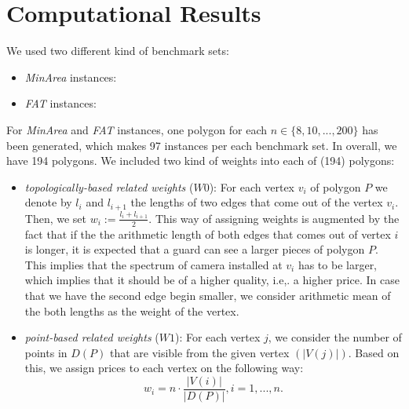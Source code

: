 \documentclass[runningheads,a4paper]{elsarticle}
\begin{document}
	\begin{comment}
	
	\noindent \textbf{Improvements of the above method.} The above method can serve as a basic iteration
	of a more advanced techniques like ILP-LNS or CMSA. In this case, methods for destructing the solutions
	has to be proposed.  Underlying idea could be:
	\begin{itemize}
	\item remove $N$ guards with the largest costs out of $C'$
	\item remove $N$ guards which have a higher amount of points from $D(P)$ covered by other guards, represented by the function
	\begin{align}
	ratio(i) = \frac{\sum_{v \in V\setminus{ \{i\}}, j \in V(i)} 1_{j \mbox{ is veasible from } v} }{|V(i)|}.
	\end{align}
	\end{itemize}
	\end{comment}
	
	\section{Computational Results}

 We used two different kind of benchmark sets:
     \begin{itemize}
     	 \item \emph{MinArea} instances:
     	 \item \emph{FAT} instances: 
     \end{itemize}
     For \emph{MinArea} and \emph{FAT} instances, one polygon for each $n \in\{8,10,...,200\}$ has been generated, which makes 97 instances per each benchmark set. In overall, we have 194 polygons. 
	We included two kind of weights into each of (194) polygons:
	\begin{itemize}
		\item \emph{topologically-based related weights} ($W0$): For each vertex $v_i$ of polygon $P$ we denote by $l_i$ and $l_{i+1}$ the lengths of two edges that come out of the vertex $v_i$. Then, we set $w_i := \frac{l_i + l_{i+1}}{2}$. This way of assigning weights is augmented by the fact that if the the arithmetic length of both edges that comes out of vertex $i$ is longer, it is expected that a guard can see a larger pieces of polygon $P$. This implies that the spectrum of camera installed at $v_i$ has to be larger, which implies that it should be of a higher quality, i.e,. a higher price. In case that we have the second edge begin smaller, we consider arithmetic mean of the both lengths as the weight of the vertex.
		\item \emph{point-based related weights} ($W1$): For each vertex $j$, we consider the number of points in $D(P)$ that are visible from the given vertex $(|V(j)|)$. Based on this, we assign prices to each vertex on the following way:
		\begin{equation}
		w_i = n \cdot \frac{|V(i)|}{|D(P)|}, i=1,...,n.
		\end{equation}
	\end{itemize}
    
\end{document}
